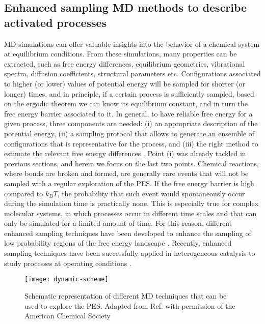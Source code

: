 \subsection*{Enhanced sampling MD methods to describe activated processes}
MD simulations can offer valuable insights into the behavior of a chemical system at equilibrium conditions. From these simulations, many properties can be extracted, such as free energy differences, equilibrium geometries, vibrational spectra, diffusion coefficients, structural parameters etc. 
Configurations associated to higher (or lower) values of potential energy will be sampled for shorter (or longer) times, and in principle, if a certain process is sufficiently sampled, based on the ergodic theorem we can know its equilibrium constant, and in turn the free energy barrier associated to it.
In general, to have reliable free energy for a given process, three components are needed: (i) an appropriate description of the potential energy, (ii) a sampling protocol that allows to generate an ensemble of configurations that is representative for the process, and (iii) the right method to estimate the relevant free energy differences \cite{demuynck2017efficient}. Point (i) was already tackled in previous sections, and herein we focus on the last two points.
\npar
Chemical reactions, where bonds are broken and formed, are generally rare events that will not be sampled with a regular exploration of the PES. If the free energy barrier is high compared to $k_{B}T$, the probability that such event would spontaneously occur during the simulation time is practically none. This is especially true for complex molecular systems, in which processes occur in different time scales and that can only be simulated for a limited amount of time. For this reason, different enhanced sampling techniques have been developed to enhance the sampling of low probability regions of the free energy landscape \cite{valsson2016enhancing, laio2002escaping, sutto2012new, carter1989constrained, darve2001calculating, jarzynski1997nonequilibrium, rosso2002use, gullingsrud1999reconstructing}. Recently, enhanced sampling techniques have been successfully applied in heterogeneous catalysis to study processes at operating conditions \cite{dewispelaere2016insight, dewispelaere2015complex, vanspeybroeck2014first, cnudde2017effect, haigis2015hydrothermal, buvcko2011monomolecular, fraux2017recent}.
\npar
\begin{figure}[!htbp]
	\centering
 	\texttt{[image: dynamic-scheme]}
	\caption{Schematic representation of different MD techniques that can be used to explore the PES. Adapted from Ref. \cite{demuynck2017efficient} with permission of the American Chemical Society}
	\label{fig:dynamic-scheme}
\end{figure}


